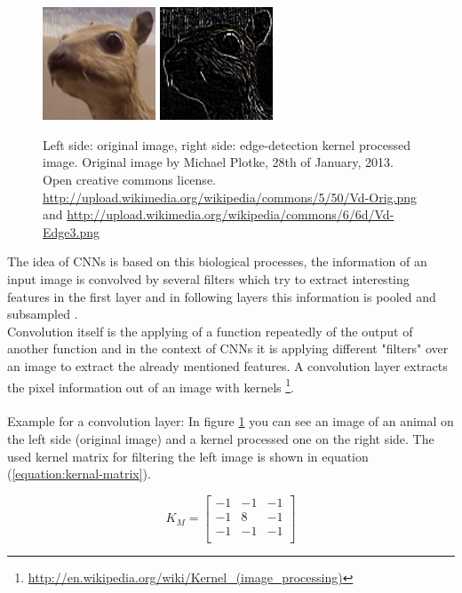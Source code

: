 \documentclass[12pt,twoside]{article}
\theoremstyle{plain}
\theoremstyle{definition}
\theoremstyle{remark}
\begin{document}
\begin{figure}
	\centerline{
		\includegraphics[width=0.3\textwidth]{animal-original.png}
		\qquad
		\includegraphics[width=0.3\textwidth]{animal-edge-detection.png}
	}
	{\caption{Left side: original image, right side: edge-detection kernel processed image. Original image by Michael Plotke, 28th of January, 2013. Open creative commons license.
			\protect\url{http://upload.wikimedia.org/wikipedia/commons/5/50/Vd-Orig.png} and \protect\url{http://upload.wikimedia.org/wikipedia/commons/6/6d/Vd-Edge3.png}}\label{fig:animal-edge-detection}}
\end{figure}
The idea of CNNs is based on this biological processes, the information of an input image is convolved by several filters which try to extract interesting features in the first layer and in following layers this information is pooled and subsampled \cite{ImangeNetClassificationCNN-Krizhevsky}.
\\
Convolution itself is the applying of a function repeatedly of the output of another function and in the context of CNNs it is applying different "filters" over an image to extract the already mentioned features. A convolution layer extracts the pixel information out of an image with kernels \footnote{\url{http://en.wikipedia.org/wiki/Kernel_(image_processing)}}.
\\
\\
Example for a convolution layer: In figure \ref{fig:animal-edge-detection} you can see an image of an animal on the left side (original image) and a kernel processed one on the right side. The used kernel matrix for filtering the left image is shown in equation (\ref{equation:kernal-matrix}).
\begin{figure}
	\begin{equation}
		\label{equation:kernal-matrix}
		K_M =
		\begin{bmatrix}
		-1 & -1 & -1 \\
		-1 & 8 & -1 \\
		-1 & -1 & -1 \\
		\end{bmatrix}
	\end{equation}
\end{figure}
\end{document}
